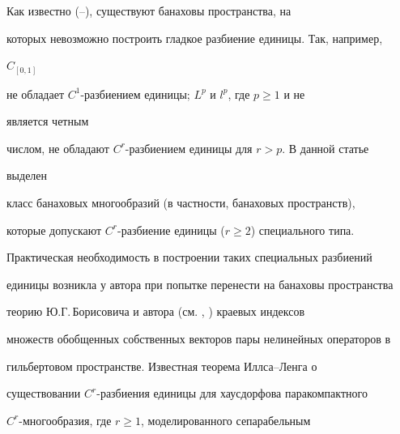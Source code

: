 \date{}







\pagestyle{plain} %













\maketitle













Как известно (\cite{1}--\cite{3}), существуют банаховы пространства, на


которых невозможно построить гладкое разбиение единицы. Так, например,


$C_{[0,1]}$


не обладает $C^1$-разбиением единицы; $L^p$ и $l^p$, где $p\ge 1$ и не


является четным


числом, не обладают $C^r$-разбиением единицы для $r>p$. В данной статье


выделен


класс банаховых многообразий (в частности, банаховых пространств),


которые допускают $C^r$-разбиение единицы ($r\ge 2$) специального типа.


Практическая необходимость в построении таких специальных разбиений


единицы возникла у автора при попытке перенести на банаховы пространства


теорию Ю.Г.\,Борисовича и автора (см. \cite{4}, \cite{5}) краевых индексов


множеств обобщенных собственных векторов пары нелинейных операторов в


гильбертовом пространстве. Известная теорема Иллса--Ленга \cite{6} о


существовании $C^r$-разбиения единицы для хаусдорфова паракомпактного


$C^r$-многообразия, где $r\ge 1$, моделированного сепарабельным


